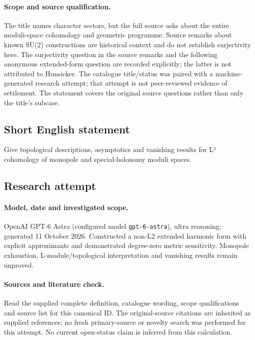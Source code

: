\documentclass[11pt]{article}
\begin{document}
\paragraph{Scope and source qualification.}The title names character sectors, but the full source asks about the entire moduli-space cohomology and geometric programme. Source remarks about known SU(2) constructions are historical context and do not establish surjectivity here. The surjectivity question in the source remarks and the following anonymous extended-form question are recorded explicitly; the latter is not attributed to Hunsicker. The catalogue title/status was paired with a machine-generated research attempt; that attempt is not peer-reviewed evidence of settlement. The statement covers the original source questions rather than only the title’s subcase.
\subsection{Short English statement}
Give topological descriptions, asymptotics and vanishing results for L² cohomology of monopole and special-holonomy moduli spaces.
\subsection{Research attempt}
\paragraph{Model, date and investigated scope.}
OpenAI GPT-6 Astra (configured model \texttt{gpt-6-astra}), ultra reasoning; generated 11 October 2026. Constructed a non-L2 extended harmonic form with explicit approximants and demonstrated degree-zero metric sensitivity. Monopole exhaustion, L-module/topological interpretation and vanishing results remain unproved.

\paragraph{Sources and literature check.}
Read the supplied complete definition, catalogue wording, scope qualifications and source list for this canonical ID. The original-source citations are inherited as supplied references; no fresh primary-source or novelty search was performed for this attempt. No current open-status claim is inferred from this calculation.
\end{document}
